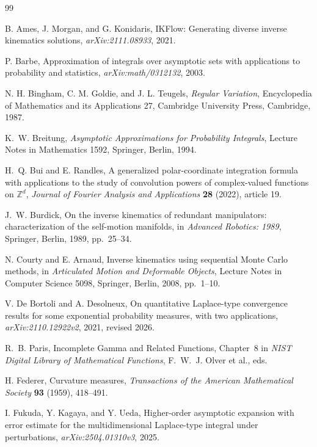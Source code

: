 \documentclass[11pt]{amsart}
\numberwithin{equation}{section}
\theoremstyle{definition}
\theoremstyle{remark}
\begin{document}
\begin{thebibliography}{99}

B. Ames, J. Morgan, and G. Konidaris,
IKFlow: Generating diverse inverse kinematics solutions,
\emph{arXiv:2111.08933}, 2021.

P. Barbe,
Approximation of integrals over asymptotic sets with applications to probability
and statistics,
\emph{arXiv:math/0312132}, 2003.

N. H. Bingham, C. M. Goldie, and J. L. Teugels,
\emph{Regular Variation},
Encyclopedia of Mathematics and its Applications 27,
Cambridge University Press, Cambridge, 1987.

K.~W. Breitung,
\emph{Asymptotic Approximations for Probability Integrals},
Lecture Notes in Mathematics 1592,
Springer, Berlin, 1994.

H.~Q. Bui and E. Randles,
A generalized polar-coordinate integration formula with applications to the
study of convolution powers of complex-valued functions on $\mathbb Z^d$,
\emph{Journal of Fourier Analysis and Applications} \textbf{28} (2022),
article 19.

J.~W. Burdick,
On the inverse kinematics of redundant manipulators:
characterization of the self-motion manifolds,
in \emph{Advanced Robotics: 1989}, Springer, Berlin, 1989, pp.~25--34.

N. Courty and E. Arnaud,
Inverse kinematics using sequential Monte Carlo methods,
in \emph{Articulated Motion and Deformable Objects}, Lecture Notes in Computer
Science 5098, Springer, Berlin, 2008, pp.~1--10.

V. De Bortoli and A. Desolneux,
On quantitative Laplace-type convergence results for some exponential
probability measures, with two applications,
\emph{arXiv:2110.12922v2}, 2021, revised 2026.

R.~B. Paris,
Incomplete Gamma and Related Functions,
Chapter~8 in \emph{NIST Digital Library of Mathematical Functions},
F.~W.~J. Olver et al., eds.

H. Federer,
Curvature measures,
\emph{Transactions of the American Mathematical Society} \textbf{93} (1959),
418--491.

I. Fukuda, Y. Kagaya, and Y. Ueda,
Higher-order asymptotic expansion with error estimate for the multidimensional
Laplace-type integral under perturbations,
\emph{arXiv:2504.01310v3}, 2025.


\end{thebibliography}
\end{document}

